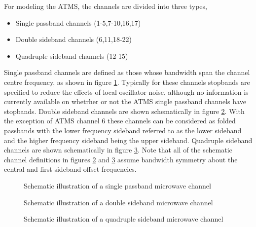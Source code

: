 
For modeling the ATMS, the channels are divided into three types,

\begin{itemize}
  \item{Single passband channels (1-5,7-10,16,17)}
  \item{Double sideband channels (6,11,18-22)}
  \item{Quadruple sideband channels (12-15)}
\end{itemize}
Single passband channels are defined as those whose bandwidth span the channel centre frequency, as shown in figure \ref{fig:single_passband}. Typically for these channels stopbands are specified to reduce the effects of local oscillator noise, although no information is currently available on whetrher or not the ATMS single passband channels have stopbands. Double sideband channels are shown schematically in figure \ref{fig:double_sideband}. With the exception of ATMS channel 6 these channels can be considered as folded passbands with the lower frequency sideband referred to as the lower sideband and the higher frequency sideband being the upper sideband. Quadruple sideband channels are shown schematically in figure \ref{fig:quadruple_sideband}. Note that all of the schematic channel definitions in figures \ref{fig:double_sideband} and \ref{fig:quadruple_sideband} assume bandwidth symmetry about the central and first sideband offset frequencies.
\begin{figure}[htp]
  \centering
  
  \caption{Schematic illustration of a single passband microwave channel}
  \label{fig:single_passband}
\end{figure}
\begin{figure}[htp]
  \centering
  
  \caption{Schematic illustration of a double sideband microwave channel}
  \label{fig:double_sideband}
\end{figure}
\begin{figure}[htp]
  \centering
  
  \caption{Schematic illustration of a quadruple sideband microwave channel}
  \label{fig:quadruple_sideband}
\end{figure}

